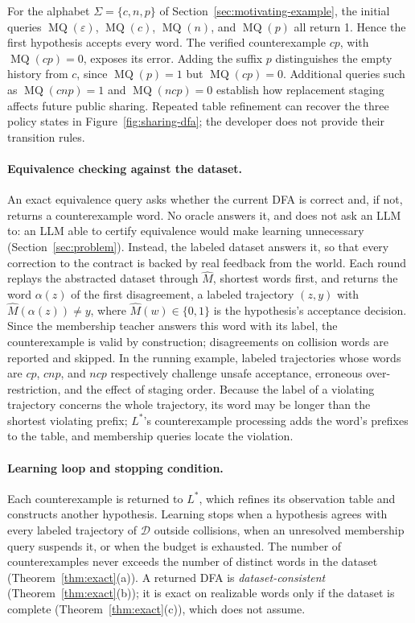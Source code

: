 For the alphabet $\Sigma=\{c,n,p\}$ of Section~\ref{sec:motivating-example}, the initial queries $\operatorname{MQ}(\varepsilon)$, $\operatorname{MQ}(c)$, $\operatorname{MQ}(n)$, and $\operatorname{MQ}(p)$ all return 1. Hence the first hypothesis accepts every word. The verified counterexample $cp$, with $\operatorname{MQ}(cp)=0$, exposes its error. Adding the suffix $p$ distinguishes the empty history from $c$, since $\operatorname{MQ}(p)=1$ but $\operatorname{MQ}(cp)=0$. Additional queries such as $\operatorname{MQ}(cnp)=1$ and $\operatorname{MQ}(ncp)=0$ establish how replacement staging affects future public sharing. Repeated table refinement can recover the three policy states in Figure~\ref{fig:sharing-dfa}; the developer does not provide their transition rules.

\paragraph{Equivalence checking against the dataset.}
An exact equivalence query asks whether the current DFA is correct and, if not, returns a counterexample word. No oracle answers it, and \system does not ask an LLM to: an LLM able to certify equivalence would make learning unnecessary (Section~\ref{sec:problem}). Instead, the labeled dataset answers it, so that every correction to the contract is backed by real feedback from the world. Each round replays the abstracted dataset through $\widehat M$, shortest words first, and returns the word $\alpha(z)$ of the first disagreement, a labeled trajectory $(z,y)$ with $\widehat M(\alpha(z))\neq y$, where $\widehat M(w)\in\{0,1\}$ is the hypothesis's acceptance decision. Since the membership teacher answers this word with its label, the counterexample is valid by construction; disagreements on collision words are reported and skipped. In the running example, labeled trajectories whose words are $cp$, $cnp$, and $ncp$ respectively challenge unsafe acceptance, erroneous over-restriction, and the effect of staging order. Because the label of a violating trajectory concerns the whole trajectory, its word may be longer than the shortest violating prefix; $L^*$'s counterexample processing adds the word's prefixes to the table, and membership queries locate the violation.

\paragraph{Learning loop and stopping condition.}
Each counterexample is returned to $L^*$, which refines its observation table and constructs another hypothesis. Learning stops when a hypothesis agrees with every labeled trajectory of $\mathcal{D}$ outside collisions, when an unresolved membership query suspends it, or when the budget is exhausted. The number of counterexamples never exceeds the number of distinct words in the dataset (Theorem~\ref{thm:exact}(a)). A returned DFA is \emph{dataset-consistent} (Theorem~\ref{thm:exact}(b)); it is exact on realizable words only if the dataset is complete (Theorem~\ref{thm:exact}(c)), which \system does not assume.

